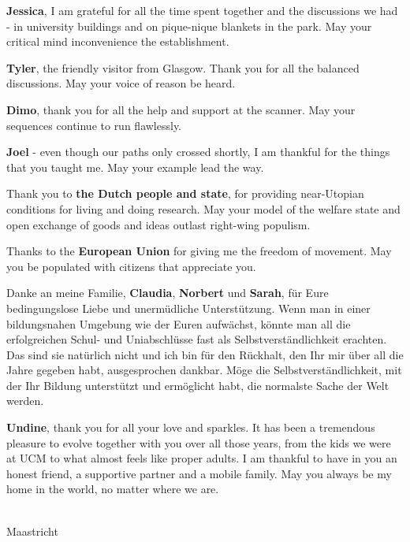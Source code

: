 \textbf{Jessica}, I am grateful for all the time spent together and the discussions we had - in university buildings and on pique-nique blankets in the park. May your critical mind inconvenience the establishment.

\textbf{Tyler}, the friendly visitor from Glasgow. Thank you for all the balanced discussions. May your voice of reason be heard.

\textbf{Dimo}, thank you for all the help and support at the scanner. May your sequences continue to run flawlessly. 

\textbf{Joel} - even though our paths only crossed shortly, I am thankful for the things that you taught me. May your example lead the way.

Thank you to \textbf{the Dutch people and state}, for providing near-Utopian conditions for living and doing research. May your model of the welfare state and open exchange of goods and ideas outlast right-wing populism.

Thanks to the \textbf{European Union} for giving me the freedom of movement. May you be populated with citizens that appreciate you.

Danke an meine Familie, \textbf{Claudia}, \textbf{Norbert} und \textbf{Sarah}, für Eure bedingungslose Liebe und unermüdliche Unterstützung. Wenn man in einer bildungsnahen Umgebung wie der Euren aufwächst, könnte man all die erfolgreichen Schul- und Uniabschlüsse fast als Selbstverständlichkeit erachten. Das sind sie natürlich nicht und ich bin für den Rückhalt, den Ihr mir über all die Jahre gegeben habt, ausgesprochen dankbar. Möge die Selbstverständlichkeit, mit der Ihr Bildung unterstützt und ermöglicht habt, die normalste Sache der Welt werden.

\textbf{Undine}, thank you for all your love and sparkles.
It has been a tremendous pleasure to evolve together with you over all those years, from the kids we were at UCM to what almost feels like proper adults. I am thankful to have in you an honest friend, a supportive partner and a mobile family. May you always be my home in the world, no matter where we are.

{\flushright \thesisauthor \\ Maastricht \\ \thesisdate \\ }